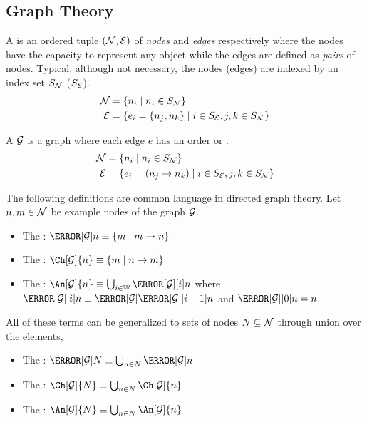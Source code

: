 \documentclass[aps, 10pt, english, twoside, pra, nofootinbib, longbibliography]{revtex4-1}
\begin{document}
    \subsection{Graph Theory}
    \begin{definition}
        \label{def:graph}
        A  is an ordered tuple $\br{\nodes, \edges}$ of \textit{nodes} and \textit{edges} respectively where the nodes have the capacity to represent any object while the edges are defined as \textit{pairs} of nodes. Typical, although not necessary, the nodes (edges) are indexed by an index set $S_{\mathcal{N}}$ ($S_{\mathcal{E}}$).
        \begin{align*}
            \nodes &= \bc{n_i \mid n_i \in \ind_{\nodes}} \\
            \edges &= \bc{e_i = \bc{n_j, n_k} \mid i \in \ind_{\edges}, j,k \in \ind_{\nodes}}
        \end{align*}
    \end{definition}

    \begin{definition}
        \label{def:directed_graph}
        A  $\mathcal{G}$ is a graph where each edge $e$ has an order or .
        \begin{align*}
            \nodes &= \bc{n_i \mid n_i \in \ind_{\nodes}} \\
            \edges &= \bc{e_i = \br{n_j \to n_k} \mid i \in \ind_{\edges}, j,k \in \ind_{\nodes}}
        \end{align*}
    \end{definition}

    \begin{definition}
        \label{def:graph_terms}
        The following definitions are common language in directed graph theory. Let $n, m \in \mathcal{N}$ be example nodes of the graph $\mathcal{G}$.
        \begin{itemize}
            \item The : $\Pa[\graph]{n} \defined \bc{m \mid m \to n}$
            \item The : $\Ch[\graph]{n} \defined \bc{m \mid n \to m}$
            \item The : $\An[\graph]{n} \defined \bigcup_{i\in\mathbb{W}} \Pa[\graph][i]{n}$ where $\Pa[\graph][i]{n} \defined \Pa[\graph]{\Pa[\graph][i-1]{n}}$ and $\Pa[\graph][0]{n} = n$
        \end{itemize}
        All of these terms can be generalized to sets of nodes $N \subseteq \mathcal{N}$ through union over the elements,
        \begin{itemize}
            \item The : $\Pa[\graph]{N} \defined \bigcup_{n\in N}\Pa[\graph]{n}$
            \item The : $\Ch[\graph]{N} \defined \bigcup_{n\in N}\Ch[\graph]{n}$
            \item The : $\An[\graph]{N} \defined \bigcup_{n\in N}\An[\graph]{n}$
        \end{itemize}
    \end{definition}
\end{document}
